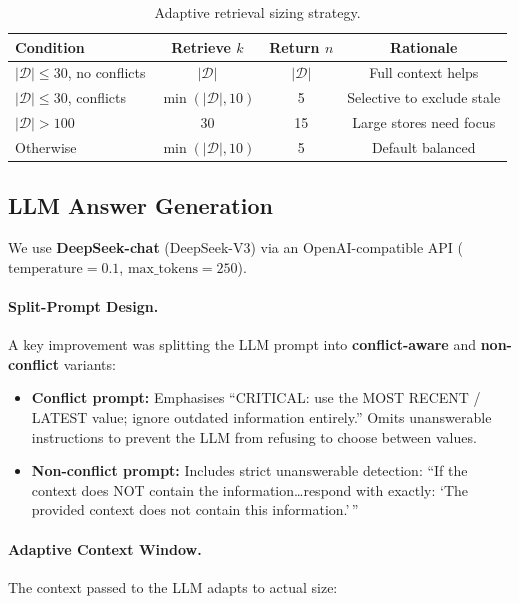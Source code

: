 \documentclass[11pt,a4paper]{article}
\begin{document}
\begin{table}[H]
\centering
\caption{Adaptive retrieval sizing strategy.}
\small
\begin{tabular}{lccc}
\toprule
\textbf{Condition} & \textbf{Retrieve $k$} & \textbf{Return $n$} & \textbf{Rationale} \\
\midrule
$|\mathcal{D}| \leq 30$, no conflicts & $|\mathcal{D}|$ & $|\mathcal{D}|$ & Full context helps \\
$|\mathcal{D}| \leq 30$, conflicts   & $\min(|\mathcal{D}|, 10)$ & 5 & Selective to exclude stale \\
$|\mathcal{D}| > 100$                & 30 & 15 & Large stores need focus \\
Otherwise                            & $\min(|\mathcal{D}|, 10)$ & 5 & Default balanced \\
\bottomrule
\end{tabular}
\end{table}


\subsection{LLM Answer Generation}
\label{sec:llm}

We use \textbf{DeepSeek-chat} (DeepSeek-V3) via an OpenAI-compatible API
($\text{temperature} = 0.1$, $\text{max\_tokens} = 250$).

\paragraph{Split-Prompt Design.}
A key improvement was splitting the LLM prompt into \textbf{conflict-aware} and
\textbf{non-conflict} variants:

\begin{itemize}[nosep]
    \item \textbf{Conflict prompt:} Emphasises ``CRITICAL: use the MOST RECENT /
          LATEST value; ignore outdated information entirely.'' Omits unanswerable
          instructions to prevent the LLM from refusing to choose between values.
    \item \textbf{Non-conflict prompt:} Includes strict unanswerable detection:
          ``If the context does NOT contain the information\ldots respond with
          exactly: `The provided context does not contain this information.'\,''
\end{itemize}

\paragraph{Adaptive Context Window.}
The context passed to the LLM adapts to actual size:
\end{document}
